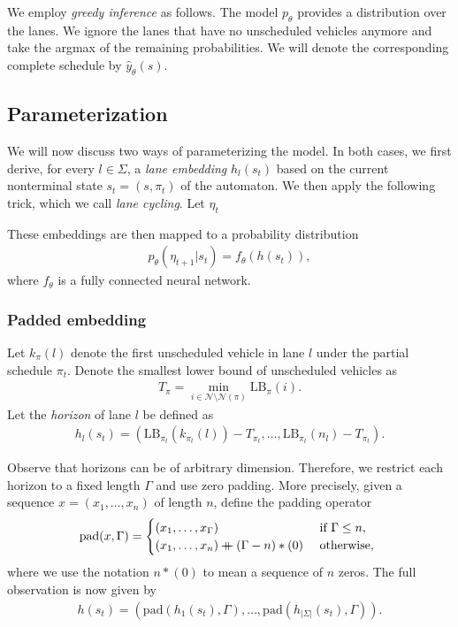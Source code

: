 \documentclass[a4paper]{article}
\newcommand\mdoubleplus{\mathbin{+\mkern-10mu+}}
\theoremstyle{definition}
\theoremstyle{plain}
\begin{document}
We employ \textit{greedy inference} as follows. The model $p_{\theta}$ provides
a distribution over the lanes. We ignore the lanes that have no unscheduled
vehicles anymore and take the argmax of the remaining probabilities. We will
denote the corresponding complete schedule by $\hat{y}_{\theta}(s)$.

\subsection*{Parameterization}

We will now discuss two ways of parameterizing the model. In both cases, we
first derive, for every $l \in \Sigma$, a \textit{lane embedding} $h_{l}(s_{t})$
based on the current nonterminal state $s_{t} = (s, \pi_{t})$ of the automaton.
We then apply the following trick, which we call \textit{lane cycling}.
Let $\eta_{t}$

These embeddings are then mapped to a probability distribution
\begin{align*}
  p_{\theta}(\eta_{t+1} | s_{t}) = f_{\theta}(h(s_{t})) ,
\end{align*}
where $f_{\theta}$ is a fully connected neural network.


\subsubsection*{Padded embedding}
%
Let $k_{\pi}(l)$ denote the first unscheduled vehicle in lane $l$ under the partial schedule $\pi_{t}$.
Denote the smallest lower bound of unscheduled vehicles as
\begin{align*}
  T_{\pi} = \min_{i \in \mathcal{N} \setminus \mathcal{N}(\pi)} \text{LB}_{\pi}(i) .
\end{align*}
Let the \textit{horizon} of lane $l$ be defined as
\begin{align*}
  h_{l}(s_{t}) = ( \text{LB}_{\pi_{t}}(k_{\pi_{t}}(l)) - T_{\pi_{t}}, \dots, \text{LB}_{\pi_{t}}(n_{l}) - T_{\pi_{t}} ) .
\end{align*}

Observe that horizons can be of arbitrary dimension. Therefore, we restrict each
horizon to a fixed length $\Gamma$ and use zero padding. More precisely, given a
sequence $x = (x_{1}, \dots, x_{n})$ of length $n$, define the padding
operator
\begin{align*}
  \text{pad}(x, \Gamma) = \begin{cases}
                            (x_{1}, \dots, x_{\Gamma}) &\text{ if } \Gamma \leq n,  \\
                            (x_{1}, \dots, x_{n}) \mdoubleplus (\Gamma - n) * (0) &\text{ otherwise, }
                            \end{cases}
\end{align*}
where we use the notation $n * (0)$ to mean a sequence of $n$ zeros. The full
observation is now given by
\begin{align*}
  h(s_{t}) = (\text{pad}(h_{1}(s_{t}), \Gamma), \dots, \text{pad}(h_{|\Sigma|}(s_{t}), \Gamma)) .
\end{align*}
%
\end{document}
